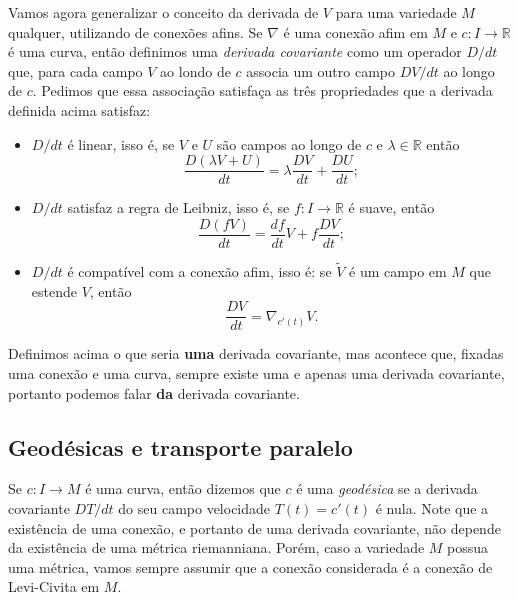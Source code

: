\documentclass{article}
\begin{document}
Vamos agora generalizar o conceito da derivada de $V$ para uma variedade $M$ qualquer, utilizando de conexões afins. Se $\nabla$ é uma conexão afim em $M$ e $c \colon I \to \mathbb{R}$ é uma curva, então definimos uma \textit{derivada covariante} como um operador $D/dt$ que, para cada campo $V$ ao londo de $c$ associa um outro campo $DV/dt$ ao longo de $c$. Pedimos que essa associação satisfaça as três propriedades que a derivada definida acima satisfaz: \begin{itemize}
    \item $D/dt$ é linear, isso é, se $V$ e $U$ são campos ao longo de $c$ e $\lambda \in \mathbb{R}$ então \begin{equation}
        \frac{D(\lambda V + U)}{dt}  = \lambda\frac{DV}{dt} + \frac{DU}{dt};
    \end{equation}
    
    \item $D/dt$ satisfaz a regra de Leibniz, isso é, se $f \colon I \to \mathbb{R}$ é suave, então \begin{equation}
        \frac{D(fV)}{dt} = \frac{df}{dt}V + f\frac{DV}{dt};
    \end{equation}

    \item $D/dt$ é compatível com a conexão afim, isso é: se $\tilde{V}$ é um campo em $M$ que estende $V$, então \begin{equation}
        \frac{DV}{dt} = \nabla_{c'(t)}V.
    \end{equation}
\end{itemize}

Definimos acima o que seria \textbf{uma} derivada covariante, mas acontece que, fixadas uma conexão e uma curva, sempre existe uma e apenas uma derivada covariante, portanto podemos falar \textbf{da} derivada covariante.

\subsection{Geodésicas e transporte paralelo}

Se $c \colon I \to M$ é uma curva, então dizemos que $c$ é uma \textit{geodésica} se a derivada covariante $DT/dt$ do seu campo velocidade $T(t) = c'(t)$ é nula. Note que a existência de uma conexão, e portanto de uma derivada covariante, não depende da existência de uma métrica riemanniana. Porém, caso a variedade $M$ possua uma métrica, vamos sempre assumir que a conexão considerada é a conexão de Levi-Civita em $M$.
\end{document}
